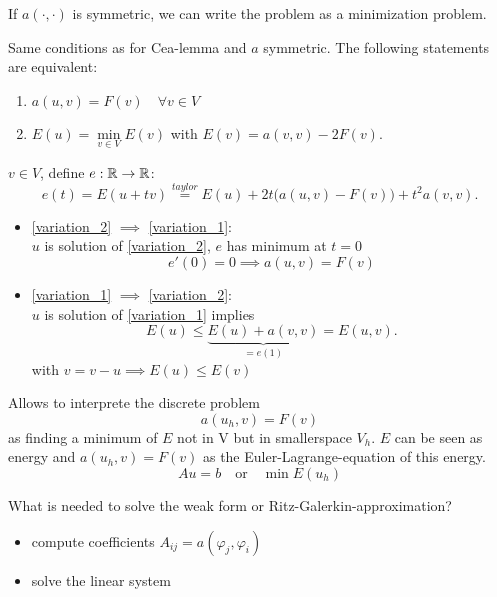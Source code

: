 If $a(\cdot,\cdot)$ is symmetric, we can write the problem as a minimization problem.
\begin{lemma_}
	Same conditions as for Cea-lemma and $a$ symmetric. The following statements are equivalent:
	\begin{enumerate}[label=(\alph*)]
		\item \label{variation_1} $a(u,v)= F(v) \quad \forall v\in V$ 
		\item \label{variation_2} $E(u) = \underset{v \in V}{\min}E(v) $ with $E(v) = a(v,v) -2F(v)$.
	\end{enumerate}
\end{lemma_}

\begin{proof_}
	$v \in V$, define $e:\mathbb{R} \to \mathbb{R}$:
	\begin{equation*}
		e(t) = E(u+tv) \overset{taylor}{=} E(u) + 2t\big ( a(u,v) - F(v)\big ) +t^2 a(v,v)  .
	\end{equation*}
	\begin{itemize}
		\item  \ref{variation_2} $\implies$  \ref{variation_1}:\\
			$u$ is solution of \ref{variation_2}, $e$ has minimum at $t=0$
			\begin{equation*}
				e'(0)=0 \implies a(u,v)=F(v)
			\end{equation*} 
		\item \ref{variation_1} $\implies$  \ref{variation_2}:\\
			$u$ is solution of \ref{variation_1} implies
			\begin{equation*}
				E(u) \leq \underbrace{E(u) + a(v,v)}_{= e(1)} = E(u,v).
			\end{equation*}
			with $v = v-u \implies E(u) \leq E(v)$
	\end{itemize}
\end{proof_}

Allows to interprete the discrete problem 
\begin{equation*}
	a(u_h,v) = F(v)
\end{equation*}
as finding a minimum of $E$ not in V but in \glqq smaller\grqq space $V_h$. $E$ can be seen as energy and $a(u_h,v) = F(v)$ as the Euler-Lagrange-equation of this energy. 
\begin{equation*}
	Au=b \quad \text{or} \quad \min E(u_h)
\end{equation*}
\par
What is needed to solve the weak form or Ritz-Galerkin-approximation?
\begin{itemize}
	\item compute coefficients $A_{ij} = a(\varphi_j,\varphi_i)$
	\item solve the linear system
\end{itemize}

